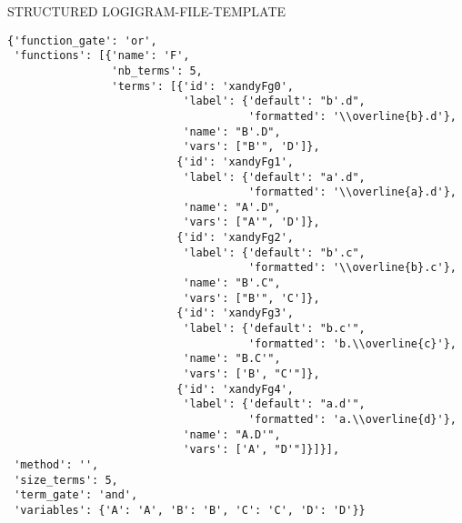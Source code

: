 STRUCTURED LOGIGRAM-FILE-TEMPLATE
\begin{verbatim}
{'function_gate': 'or',
 'functions': [{'name': 'F',
                'nb_terms': 5,
                'terms': [{'id': 'xandyFg0',
                           'label': {'default': "b'.d",
                                     'formatted': '\\overline{b}.d'},
                           'name': "B'.D",
                           'vars': ["B'", 'D']},
                          {'id': 'xandyFg1',
                           'label': {'default': "a'.d",
                                     'formatted': '\\overline{a}.d'},
                           'name': "A'.D",
                           'vars': ["A'", 'D']},
                          {'id': 'xandyFg2',
                           'label': {'default': "b'.c",
                                     'formatted': '\\overline{b}.c'},
                           'name': "B'.C",
                           'vars': ["B'", 'C']},
                          {'id': 'xandyFg3',
                           'label': {'default': "b.c'",
                                     'formatted': 'b.\\overline{c}'},
                           'name': "B.C'",
                           'vars': ['B', "C'"]},
                          {'id': 'xandyFg4',
                           'label': {'default': "a.d'",
                                     'formatted': 'a.\\overline{d}'},
                           'name': "A.D'",
                           'vars': ['A', "D'"]}]}],
 'method': '',
 'size_terms': 5,
 'term_gate': 'and',
 'variables': {'A': 'A', 'B': 'B', 'C': 'C', 'D': 'D'}}
\end{verbatim}





